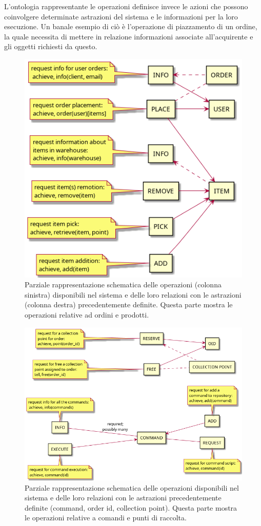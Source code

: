 \parag
L'ontologia rappresentante le operazioni definisce invece le azioni che possono coinvolgere determinate astrazioni del sistema e le informazioni per la loro esecuzione. Un banale esempio di ciò è l'operazione di piazzamento di un ordine, la quale necessita di mettere in relazione informazioni associate all'acquirente e gli oggetti richiesti da questo.
\begin{figure}[!ht]\centering
    \includegraphics[width=.7\textwidth]{section/design/figure/ontology/ontology_operations-1.png}
    \caption{Parziale rappresentazione schematica delle operazioni (colonna sinistra) disponibili nel sistema e delle loro relazioni con le astrazioni (colonna destra) precedentemente definite. Questa parte mostra le operazioni relative ad ordini e prodotti.}
    \label{fig:ontology_operations-1}
\end{figure}
\begin{figure}[!ht]\centering
    \includegraphics[width=\textwidth]{section/design/figure/ontology/ontology_operations-2.png}
    \caption{Parziale rappresentazione schematica delle operazioni disponibili nel sistema e delle loro relazioni con le astrazioni precedentemente definite (command, order id, collection point). Questa parte mostra le operazioni relative a comandi e punti di raccolta.}
    \label{fig:ontology_operations-2}
\end{figure}

